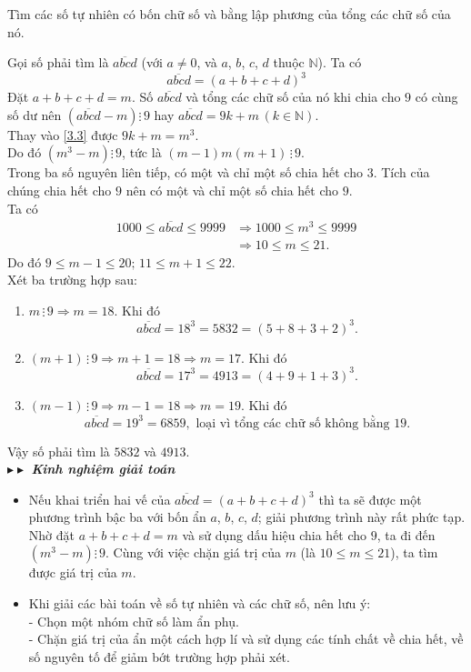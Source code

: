 \begin{vd}
 Tìm các số tự nhiên có bốn chữ số và bằng lập phương của tổng các chữ số của nó.
 \loigiai
  {
  Gọi số phải tìm là $\overline{abcd}$ (với $a \neq 0$, và $a$, $b$, $c$, $d$ thuộc $\mathbb{N}$). Ta có
  \begin{equation}
   \overline{abcd} = (a + b + c + d)^3 \label{3.3}
  \end{equation}
  Đặt $a + b + c + d = m$. Số $\overline{abcd}$ và tổng các chữ số của nó khi chia cho $9$ có cùng số dư nên $\left( \overline{abcd} - m \right) \vdots \, 9$ hay $\overline{abcd} = 9k + m \, (k \in \mathbb{N})$.\\
  Thay vào \eqref{3.3} được $9k + m = m^3$.\\
  Do đó $\left( m^3 - m \right) \vdots \, 9$, tức là $(m - 1)m(m + 1) \, \vdots \, 9$.\\
  Trong ba số nguyên liên tiếp, có một và chỉ một số chia hết cho $3$. Tích của chúng chia hết cho $9$ nên có một và chỉ một số chia hết cho $9$.\\
  Ta có
  \begin{align*}
   1000 \leq \overline{abcd} \leq 9999 & \Rightarrow 1000 \leq m^3 \leq 9999 \\
   & \Rightarrow 10 \leq m \leq 21.
  \end{align*}
  Do đó $9 \leq m - 1 \leq 20; \, 11 \leq m + 1 \leq 22$.\\
  Xét ba trường hợp sau:
  \begin{enumerate}
   \item $m \, \vdots \, 9 \Rightarrow m = 18$. Khi đó
   $$\overline{abcd} = 18^3 = 5832 = (5 + 8 + 3 + 2)^3.$$
   \item $(m + 1) \, \vdots \, 9 \Rightarrow m + 1 = 18 \Rightarrow m = 17$. Khi đó
   $$\overline{abcd} = 17^3 = 4913 = (4 + 9 + 1 + 3)^3.$$
   \item $(m - 1) \, \vdots \, 9 \Rightarrow m - 1 = 18 \Rightarrow m = 19$. Khi đó
   $$\overline{abcd} = 19^3 = 6859, \textrm{ loại vì tổng các chữ số không bằng } 19.$$
  \end{enumerate}
  Vậy số phải tìm là $5832$ và $4913$.\\
  $\blacktriangleright\blacktriangleright$ \textbf{\textit{Kinh nghiệm giải toán}}
  \begin{itemize}
   \item Nếu khai triển hai vế của $\overline{abcd} = (a + b + c + d)^3$ thì ta sẽ được một phương trình bậc ba với bốn ẩn $a$, $b$, $c$, $d$; giải phương trình này rất phức tạp.\\
   Nhờ đặt $a + b + c + d = m$ và sử dụng dấu hiệu chia hết cho $9$, ta đi đến $\left( m^3 - m \right) \vdots \, 9$. Cùng với việc chặn giá trị của $m$ (là $10 \leq m \leq 21$), ta tìm được giá trị của $m$.
   \item Khi giải các bài toán về số tự nhiên và các chữ số, nên lưu ý:\\
   - Chọn một nhóm chữ số làm ẩn phụ.\\
   - Chặn giá trị của ẩn một cách hợp lí và sử dụng các tính chất về chia hết, về số nguyên tố để giảm bớt trường hợp phải xét.
  \end{itemize}
  }
\end{vd}


